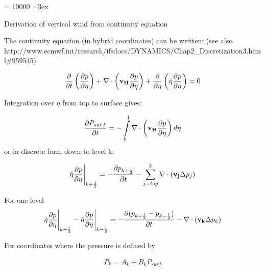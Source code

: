 \tolerance = 10000
\parskip=3ex



                 


{\Huge Derivation of vertical wind from continuity equation}



\vspace{1cm}

\author{Peter Wind}



The continuity equation (in hybrid coordinates) can be written:
(see also http://www.ecmwf.int/research/ifsdocs/DYNAMICS/Chap2\_Discretization3.html\#959545)

\begin{eqnarray} \nonumber
\frac{\partial}{\partial t}\left(\frac{\partial p}{\partial \eta}\right)+\nabla \cdot \left({\bf v_H} \frac{\partial p}{\partial \eta}\right)+\frac{\partial }{\partial \eta}\left(\dot \eta \frac{\partial p}{\partial \eta}\right) = 0
\end{eqnarray}

Integration over $\eta  $ from top to surface gives:

\begin{eqnarray} \nonumber
\frac{\partial P_{surf}}{\partial t}= -\int\limits_{0}^{1}  \nabla \cdot \left({\bf v_H} \frac{\partial p}{\partial \eta}\right) d\eta
\end{eqnarray}
or in discrete form down to level k:

\begin{eqnarray} \nonumber
\dot \eta \frac{\partial p}{\partial \eta}{\Bigg \vert_{k+\frac{1}{2}}} = -\frac{\partial p_{k+\frac{1}{2}}}{\partial t}-\sum_{j=top}^{k} \nabla \cdot \left({\bf v_j} \Delta p_j\right)
\end{eqnarray}

For one level
\begin{eqnarray} \nonumber
\dot \eta \frac{\partial p}{\partial \eta}{\Bigg \vert_{k+\frac{1}{2}}} - \dot \eta \frac{\partial p}{\partial \eta}{\Bigg \vert_{k-\frac{1}{2}}}= -\frac{\partial (p_{k+\frac{1}{2}}-p_{k-\frac{1}{2}})}{\partial t}- \nabla \cdot \left({\bf v_k} \Delta p_k\right)
\end{eqnarray}


For coordinates where the pressure is defined by

\begin{eqnarray} \nonumber
P_k=A_k+B_k P_{surf}
\end{eqnarray}

